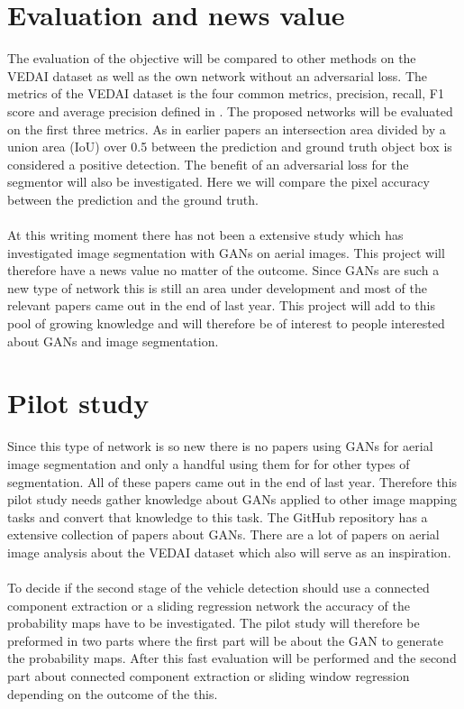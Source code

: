 \documentclass[a4paper,11pt]{article}
\begin{document}
\section{Evaluation and news value}
The evaluation of the objective will be compared to other methods on the VEDAI dataset as well as the own network without an adversarial loss. The metrics of the VEDAI dataset is the four common metrics, precision, recall, F1 score and average precision defined in \citep{razakarivony_vehicle_2015}. The proposed networks will be evaluated on the first three metrics. As in earlier papers an intersection area divided by a union area (IoU) over 0.5 between the prediction and ground truth object box is considered a positive detection. The benefit of an adversarial loss for the segmentor will also be investigated. Here we will compare the pixel accuracy between the prediction and the ground truth.\\
\\
At this writing moment there has not been a extensive study which has investigated image segmentation with GANs on aerial images. This project will therefore have a news value no matter of the outcome. Since GANs are such a new type of network this is still an area under development and most of the relevant papers came out in the end of last year. This project will add to this pool of growing knowledge and will therefore be of interest to people interested about GANs and image segmentation.
\section{Pilot study}
Since this type of network is so new there is no papers using GANs for aerial image segmentation and only a handful using them for for other types of segmentation. All of these papers came out in the end of last year. Therefore this pilot study needs gather knowledge about GANs applied to other image mapping tasks and convert that knowledge to this task. The GitHub repository \cite{noauthor_github_nodate} has a extensive collection of papers about GANs. There are a lot of papers on aerial image analysis about the VEDAI dataset which also will serve as an inspiration.\\
\\
To decide if the second stage of the vehicle detection should use a connected component extraction or a sliding regression network the accuracy of the probability maps have to be investigated. The pilot study will therefore be preformed in two parts where the first part will be about the GAN to generate the probability maps. After this fast evaluation will be performed and the second part about connected component extraction or sliding window regression depending on the outcome of the this.
\end{document}
